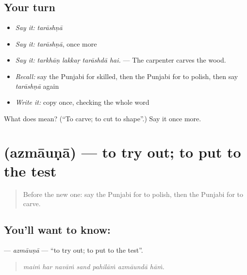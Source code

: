 \subsection*{Your turn}
\begin{itemize}
\raggedright
  \item \emph{Say it:} \emph{tarāshṇā}
  \item \emph{Say it:} \emph{tarāshṇā}, once more
  \item \emph{Say it:} \emph{tarkhāṇ lakkaṛ tarāshdā hai.} — The carpenter carves the wood.
  \item \emph{Recall:} say the Punjabi for skilled, then the Punjabi for to polish, then say \emph{tarāshṇā} again
  \item \emph{Write it:} copy \textbf{} once, checking the whole word
\end{itemize}

\begin{tcolorbox}[breakable,colback=teal!4,colframe=teal!35!black,title={Before you move on}]
What does  mean? (\textquotedblleft{}To carve; to cut to shape\textquotedblright{}.) Say it once more.
\end{tcolorbox}
\section[\texorpdfstring{\pa{ਅਜ਼ਮਾਉਣਾ} (azmāuṇā)}{ਅਜ਼ਮਾਉਣਾ (azmāuṇā)}]{ (azmāuṇā) — to try out; to put to the test}

\label{lesson:PA-C362-azmauna}



\begin{quote}
Before the new one: say the Punjabi for to polish, then the Punjabi for to carve.
\end{quote}

\subsection*{You'll want to know: }
\textbf{} — \emph{azmāuṇā} — \textquotedblleft{}to try out; to put to the test\textquotedblright{}.

\begin{quote}
      
\end{quote}

\begin{quote}
\emph{maiṁ har navāṁ sand pahilāṁ azmāundā hāṁ.}
\end{quote}


